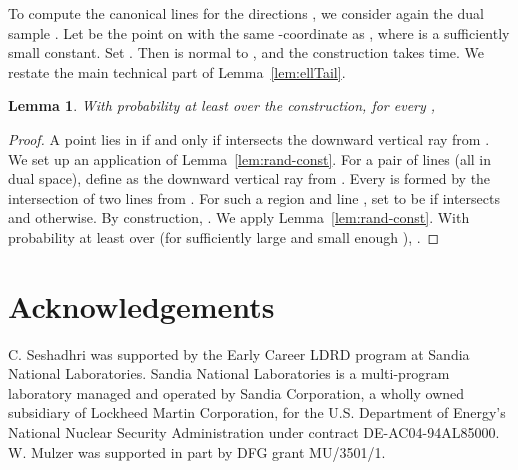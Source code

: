 \documentclass[letterpaper,11pt]{article}
\newtheorem{lemma}[theorem]{Lemma}
\begin{document}
To compute the canonical lines 
 for the directions
, we 
consider again the dual 
sample .
Let  be the point on
 with 
the same -coordinate as 
, where  
is a sufficiently
small constant.
Set .
Then 
 is normal to ,
and the construction takes  
 time. 
We restate the
main technical part 
of Lemma~\ref{lem:ellTail}.

\begin{lemma}
  With probability at least  
  over the construction, 
  for every , 
  
\end{lemma}

\begin{proof} 
A point  lies in  if
and only if 
intersects the downward 
vertical ray  from .
We set up an application of 
Lemma~\ref{lem:rand-const}. 
For a pair of lines  
(all in dual space), define 
 as 
the downward vertical ray
from . 
Every  
is formed by the intersection 
of two lines from . For 
such a region 
and line , set 
 to be  if 
 intersects 
and  otherwise.
By construction, 
.
We apply Lemma~\ref{lem:rand-const}. 
With probability at least 
 over  (for sufficiently 
large  and
small enough ),
.
\end{proof}

\section*{Acknowledgements} \label{sec:ack}

C. Seshadhri was supported 
by the Early Career LDRD 
program at Sandia National
Laboratories. Sandia National 
Laboratories is a multi-program laboratory
managed and operated by Sandia 
Corporation, a wholly owned subsidiary of
Lockheed Martin Corporation, for 
the U.S. Department of Energy's National
Nuclear Security Administration 
under contract DE-AC04-94AL85000.
W. Mulzer was supported in 
part by DFG grant MU/3501/1.



\end{document}
